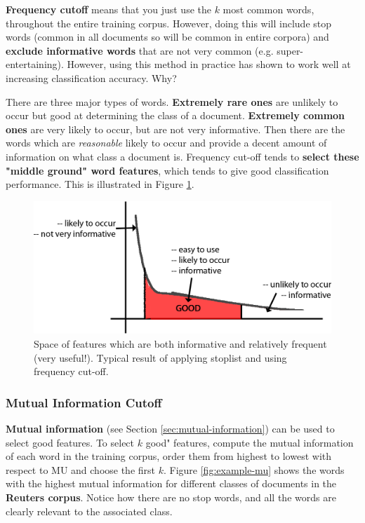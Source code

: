 \documentclass{article}
\begin{document}
\textbf{Frequency cutoff} means that you just use the $k$ most common words, throughout the entire training corpus. However, doing this will include stop words (common in all documents so will be common in entire corpora) and \textbf{exclude informative words} that are not very common (e.g. super-entertaining). However, using this method in practice has shown to work well at increasing classification accuracy. Why?

There are three major types of words. \textbf{Extremely rare ones} are unlikely to occur but good at determining the class of a document. \textbf{Extremely common ones} are very likely to occur, but are not very informative. Then there are the words which are \textit{reasonable} likely to occur and provide a decent amount of information on what class a document is. Frequency cut-off tends to \textbf{select these "middle ground" word features}, which tends to give good classification performance. This is illustrated in Figure \ref{fig:frequency-cutoff}.

\begin{figure}[H]
	\centering
	\includegraphics[scale=0.3]{figures/frequency-cutoff.png}
	\caption{Space of features which are both informative and relatively frequent (very useful!). Typical result of applying stoplist and using frequency cut-off.}
	\label{fig:frequency-cutoff}
\end{figure}

\subsubsection{Mutual Information Cutoff}

\textbf{Mutual information} (see Section \ref{sec:mutual-information}) can be used to select good features. To select $k$ good" features, compute the mutual information of each word in the training corpus, order them from highest to lowest with respect to MU and choose the first $k$. Figure \ref{fig:example-mu} shows the words with the highest mutual information for different classes of documents in the \textbf{Reuters corpus}. Notice how there are no stop words, and all the words are clearly relevant to the associated class.
\end{document}

